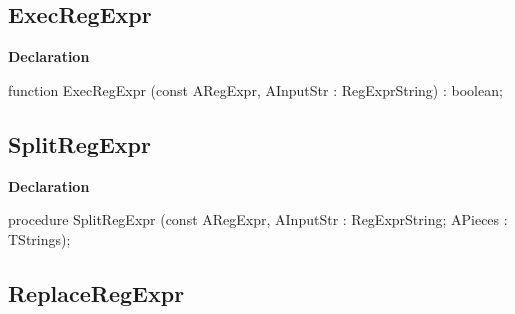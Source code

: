\documentclass{report}
\newif\ifpdf
\begin{document}
\subsection*{ExecRegExpr}
\fi
\label{RegExpr-ExecRegExpr}
\begin{list}{}{
\setlength{\itemindent}{0cm}
\setlength{\listparindent}{0cm}
\setlength{\leftmargin}{\evensidemargin}
\addtolength{\leftmargin}{\tmplength}
\settowidth{\labelsep}{X}
\addtolength{\leftmargin}{\labelsep}
\setlength{\labelwidth}{\tmplength}
}
\item[\textbf{Declaration}\hfill]
\ifpdf
\begin{flushleft}
\fi
\begin{ttfamily}
function ExecRegExpr (const ARegExpr, AInputStr : RegExprString) : boolean;\end{ttfamily}

\ifpdf
\end{flushleft}
\fi

\end{list}
\ifpdf
\subsection*{\large{\textbf{SplitRegExpr}}\normalsize\hspace{1ex}\hrulefill}
\else
\subsection*{SplitRegExpr}
\fi
\label{RegExpr-SplitRegExpr}
\begin{list}{}{
\setlength{\itemindent}{0cm}
\setlength{\listparindent}{0cm}
\setlength{\leftmargin}{\evensidemargin}
\addtolength{\leftmargin}{\tmplength}
\settowidth{\labelsep}{X}
\addtolength{\leftmargin}{\labelsep}
\setlength{\labelwidth}{\tmplength}
}
\item[\textbf{Declaration}\hfill]
\ifpdf
\begin{flushleft}
\fi
\begin{ttfamily}
procedure SplitRegExpr (const ARegExpr, AInputStr : RegExprString; APieces : TStrings);\end{ttfamily}

\ifpdf
\end{flushleft}
\fi

\end{list}
\ifpdf
\subsection*{\large{\textbf{ReplaceRegExpr}}\normalsize\hspace{1ex}\hrulefill}
\else
\end{document}
